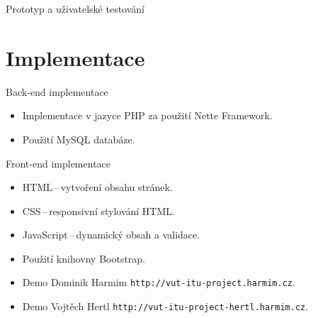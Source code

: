 \documentclass[10pt, hyperref={unicode}]{beamer}
\begin{document}
\begin{frame}{Prototyp a uživatelské testování}
\end{frame}

\section{Implementace}

\begin{frame}{Back-end implementace}
	\begin{itemize}
		\item Implementace v jazyce PHP za použití Nette Framework.
		\item Použití MySQL databáze.
	\end{itemize}
\end{frame}

\begin{frame}{Front-end implementace}
	\begin{itemize}
		\item HTML\,--\,vytvoření obsahu stránek.
		\item CSS\,--\,responsivní stylování HTML.
		\item JavaScript\,--\,dynamický obsah a validace.
		\item Použití knihovny Bootstrap.
		\item Demo Dominik Harmim
			\texttt{http://vut-itu-project.harmim.cz}.
		\item Demo Vojtěch Hertl
			\texttt{http://vut-itu-project-hertl.harmim.cz}.
	\end{itemize}
\end{frame}
\end{document}

